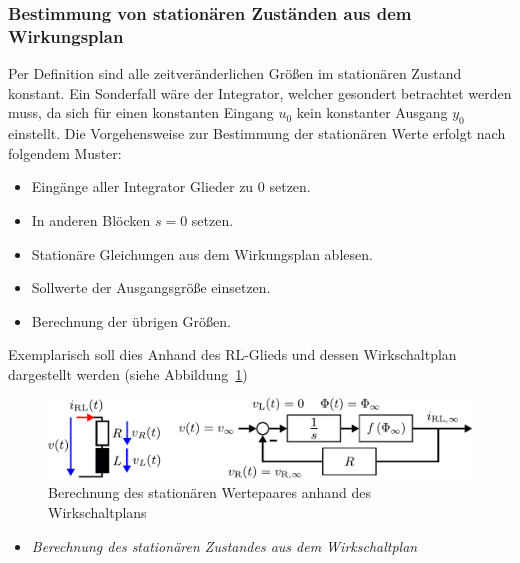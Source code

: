 \subsubsection{Bestimmung von stationären Zuständen aus dem Wirkungsplan}
%
Per Definition sind alle zeitveränderlichen Größen im stationären Zustand konstant. Ein Sonderfall wäre der Integrator, welcher gesondert betrachtet werden muss, da sich für einen konstanten Eingang $u_{0}$ kein konstanter Ausgang $y_{0}$ einstellt. Die Vorgehensweise zur Bestimmung der stationären Werte erfolgt nach folgendem Muster:
%
\begin{itemize}
	\item Eingänge aller Integrator Glieder zu 0 setzen.
	\item In anderen Blöcken $s=0$ setzen.
	\item Stationäre Gleichungen aus dem Wirkungsplan ablesen.
	\item Sollwerte der Ausgangsgröße einsetzen.
	\item Berechnung der übrigen Größen.
\end{itemize}
%
Exemplarisch soll dies Anhand des RL-Glieds und dessen Wirkschaltplan dargestellt werden (siehe Abbildung~\ref{fig:stationaer})
%
\begin{figure}[h]
	\centering
	\includegraphics[width=1\linewidth]{Abbildungen/Modellbildung/PDF/WirkschaltplanStationaer.pdf}
	\caption{Berechnung des stationären Wertepaares anhand des Wirkschaltplans}
	\label{fig:stationaer}
\end{figure}
%
\begin{Aufgaben}{}{}
	\begin{itemize}
		\item \textit{Berechnung des stationären Zustandes aus dem Wirkschaltplan}
	\end{itemize}
\end{Aufgaben}
%
